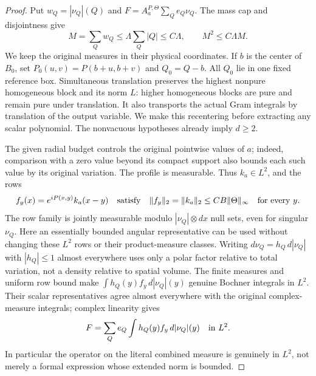 \documentclass[11pt]{article}
\numberwithin{equation}{section}
\theoremstyle{remark}
\theoremstyle{definition}
\newcommand{\norm}[1]{\lVert #1\rVert}
\begin{document}
\begin{proof}
Put $w_Q=|\nu_Q|(Q)$ and $F=A^{P,\Theta}_a\sum_Qe_Q\nu_Q$.
The mass cap and disjointness give
\[
 M=\sum_Qw_Q\le\Lambda\sum_Q|Q|\le C\Lambda,
 \qquad M^2\le C\Lambda M.
\]
We keep the original measures in their physical coordinates.  If $b$ is
the center of $B_0$, set $P_0(u,v)=P(b+u,b+v)$ and $Q_0=Q-b$.
All $Q_0$ lie in one fixed reference box.  Simultaneous translation
preserves the highest nonpure homogeneous block and its norm $L$:
higher homogeneous blocks are pure and remain pure under translation.
It also transports the actual Gram integrals by translation of the
output variable.  We make this recentering before extracting any scalar
polynomial.  The nonvacuous hypotheses already imply $d\ge2$.

The given radial budget controls the original pointwise values of $a$;
indeed, comparison with a zero value beyond its compact support also
bounds each such value by its original variation.  The profile is
measurable.  Thus $k_a\in L^2$, and the rows
\[
 f_y(x)=e^{iP(x,y)}k_a(x-y)
 \quad\hbox{satisfy}\quad
 \norm{f_y}_2=\norm{k_a}_2\le CB\norm\Theta_\infty
 \quad\hbox{for every }y.
\]
The row family is jointly measurable modulo
$|\nu_Q|\otimes dx$ null sets, even for singular $\nu_Q$.
Here an essentially bounded angular representative can be used without
changing these $L^2$ rows or their product-measure classes.
Writing $d\nu_Q=h_Q\,d|\nu_Q|$ with $|h_Q|\le1$ almost everywhere
uses only a polar factor relative to total variation, not a density
relative to spatial volume.  The finite measures and uniform row bound make
$\int h_Q(y)f_y\,d|\nu_Q|(y)$ genuine Bochner integrals in $L^2$.
Their scalar representatives agree almost everywhere with the original
complex-measure integrals; complex linearity gives
\[
 F=\sum_Q e_Q\int h_Q(y)f_y\,d|\nu_Q|(y)\quad\hbox{in }L^2.
\]
In particular the operator on the literal combined measure is genuinely
in $L^2$, not merely a formal expression whose extended norm is bounded.


\end{proof}
\end{document}

